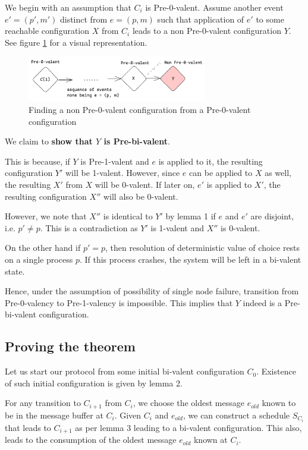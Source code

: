 We begin with an assumption that $C_i$ is Pre-0-valent. Assume another event $e' = (p', m')$ distinct from $e = (p, m)$ such that application of $e'$ to some reachable configuration $X$ from $C_i$ leads to a non Pre-0-valent configuration $Y$. See figure \ref{fig:finding-non-pre-0-valent} for a visual representation.

\begin{figure}[H]
    \centering
    \includegraphics[width=0.7\textwidth]{time-synchrony-failures/flp-impossibility/assets/flp-pre-0-valent-to-non-pre-0-valent.png}
    \caption{Finding a non Pre-0-valent configuration from a Pre-0-valent configuration}
    \label{fig:finding-non-pre-0-valent}
\end{figure}

We claim to \textbf{show that $Y$ is Pre-bi-valent}.

This is because, if $Y$ is Pre-1-valent and $e$ is applied to it, the resulting configuration $Y'$ will be 1-valent. However, since $e$ can be applied to $X$ as well, the resulting $X'$ from $X$ will be 0-valent. If later on, $e'$ is applied to $X'$, the resulting configuration $X''$ will also be 0-valent.

However, we note that $X''$ is identical to $Y'$ by lemma 1 if $e$ and $e'$ are disjoint, i.e. $p' \ne p$. This is a contradiction as $Y'$ is 1-valent and $X''$ is 0-valent.

On the other hand if $p' = p$, then resolution of deterministic value of choice rests on a single process $p$. If this process crashes, the system will be left in a bi-valent state.

Hence, under the assumption of possibility of single node failure, transition from Pre-0-valency to Pre-1-valency is impossible. This implies that $Y$ indeed is a Pre-bi-valent configuration.

\subsection{Proving the theorem}
Let us start our protocol from some initial bi-valent configuration $C_0$. Existence of such initial configuration is given by lemma 2.

For any transition to $C_{i+1}$ from $C_{i}$, we choose the oldest message $e_{old}$ known to be in the message buffer at $C_i$. Given $C_i$ and $e_{old}$, we can construct a schedule $S_{C_i}$ that leads to $C_{i+1}$ as per lemma 3 leading to a bi-valent configuration. This also, leads to the consumption of the oldest message $e_{old}$ known at $C_i$.

